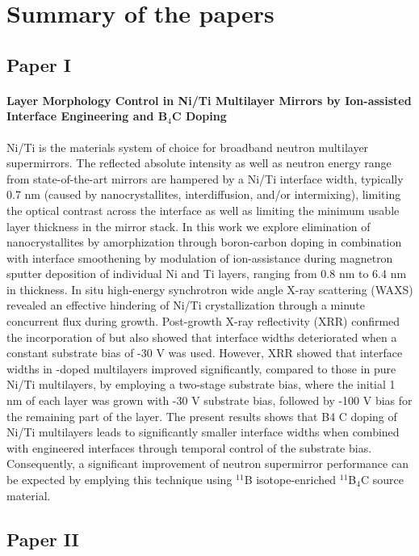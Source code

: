 \chapter{Summary of the papers}\label{summarypapers}
\section{Paper I}
\subsubsection*{Layer Morphology Control in Ni/Ti Multilayer Mirrors by  Ion-assisted Interface Engineering and  B$_\textrm{4}$C Doping}
Ni/Ti is the materials system of choice for broadband neutron multilayer supermirrors. The reflected absolute intensity as well as neutron energy range from state-of-the-art mirrors are hampered by a Ni/Ti interface width, typically 0.7 nm (caused by nanocrystallites, interdiffusion, and/or intermixing), limiting the optical contrast across the interface as well as limiting the minimum usable layer thickness in the mirror stack. In this work we explore elimination of nanocrystallites by amorphization through boron-carbon doping in combination with interface smoothening by modulation of ion-assistance during magnetron sputter deposition of individual Ni and Ti layers, ranging from 0.8 nm to 6.4 nm in thickness. In situ high-energy synchrotron wide angle X-ray scattering (WAXS) revealed an effective hindering of Ni/Ti crystallization through a minute concurrent \natBC flux during growth. Post-growth X-ray reflectivity (XRR) confirmed the incorporation of \natBC but also showed that interface widths deteriorated when a constant substrate bias of -30 V was used. However, XRR showed that interface widths in \natBC-doped multilayers improved significantly, compared to those in pure Ni/Ti multilayers, by employing a two-stage substrate bias, where the initial 1 nm of each layer was grown with -30 V substrate bias, followed by -100 V bias for the remaining part of the layer. The present results shows that B4 C doping of Ni/Ti multilayers leads to significantly smaller interface widths when combined with engineered interfaces through temporal control of the substrate bias. Consequently, a significant improvement of neutron supermirror performance can be expected by emplying this technique using $^{11}$B isotope-enriched $^{11}$B$_4$C source material.
\clearpage
\section{Paper II}
